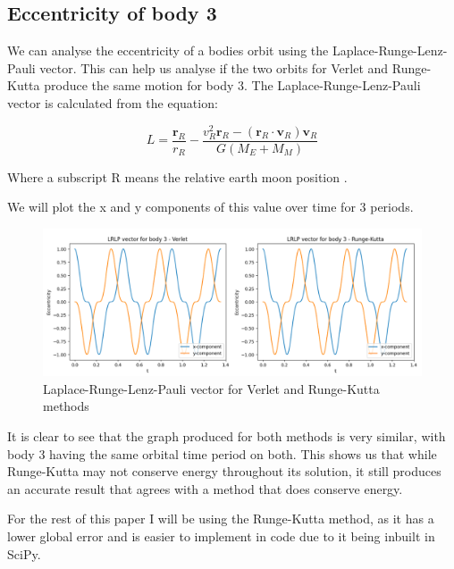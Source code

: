\documentclass[11pt]{article}
\begin{document}
\subsection{Eccentricity of body 3}

We can analyse the eccentricity of a bodies orbit using the Laplace-Runge-Lenz-Pauli vector. This can help us analyse if the two orbits for Verlet and Runge-Kutta produce the same motion for body 3. The Laplace-Runge-Lenz-Pauli vector is calculated from the equation:

$$ L = \frac{\textbf{r}_R}{r_R} - \frac{v_R^2 \textbf{r}_R - (\textbf{r}_R \cdot \textbf{v}_R) \textbf{v}_R}{G(M_E + M_M)} $$

Where a subscript R means the relative earth moon position \cite{Briefing}.
\smallskip

We will plot the x and y components of this value over time for 3 periods.

\begin{figure}[!ht]
\centerline{\includegraphics[scale=0.45]{Pictures/SEM_LRLP.png}}
\caption{Laplace-Runge-Lenz-Pauli vector for Verlet and Runge-Kutta methods}
\label{SEM_LRLP}
\end{figure}

\bigskip

It is clear to see that the graph produced for both methods is very similar, with body 3 having the same orbital time period on both. This shows us that while Runge-Kutta may not conserve energy throughout its solution, it still produces an accurate result that agrees with a method that does conserve energy.

\bigskip

For the rest of this paper I will be using the Runge-Kutta method, as it has a lower global error and is easier to implement in code due to it being inbuilt in SciPy.


\centering
\end{document}
